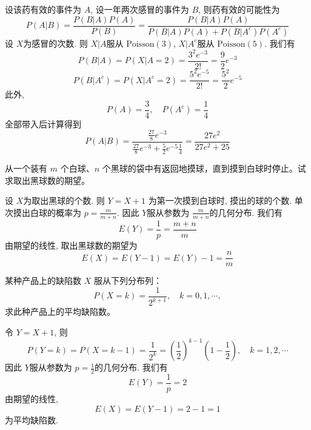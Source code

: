\documentclass[../main.tex]{subfiles}
\begin{document}
\begin{solution}
    设该药有效的事件为 \(  A  \), 设一年两次感冒的事件为 \(  B  \), 则药有效的可能性为 \[
  P\left( A|B \right) = \frac{P\left( B|A \right)P\left( A \right)   }{ P\left( B \right) }=  \frac{P\left( B|A \right)P\left( A \right)   }{P\left( B|A \right)P\left( A \right)+ P\left( B|A^{c} \right)P\left( A^{c} \right)     } 
    \] 设 \(  X  \)为感冒的次数. 则  \(  X|A  \)服从 \(  \mathrm{Poisson}\left( 3 \right)   \), \(  X|A^{c}  \)服从 \(  \mathrm{Poisson}\left( 5 \right)   \). 我们有 \[
    P\left( B|A \right)= P\left( X|A= 2 \right)= \frac{3^{2}e^{-3} }{2! }= \frac{9 }{2 }e^{-3}    
    \] \[
    P\left( B|A^{c} \right)= P\left( X|A^{c}= 2 \right)= \frac{5^{2}e^{-5} }{2! }= \frac{5^{2} }{2}e^{-5}    
    \]     此外,  \[
    P\left( A \right)= \frac{3 }{4 },\quad P\left( A^{c} \right)= \frac{1 }{4 }    
    \]全部带入后计算得到 \[
    P\left( A|B \right)= \frac{\frac{27 }{8 }e^{-3}  }{\frac{27 }{8 }e^{-3}+ \frac{5 }{2 }e^{-5}\frac{1 }{4 }    }  =\frac{27e^{2} }{27e^{2}+ 25 } 
    \]
\end{solution}

\begin{exercise}{}{}
从一个装有 $m$ 个白球、$n$ 个黑球的袋中有返回地摸球，直到摸到白球时停止。试求取出黑球数的期望。
\end{exercise}

\begin{solution}
        设 \(  X  \)为取出黑球的个数. 则 \(  Y= X+ 1  \)  为第一次摸到白球时, 摸出的球的个数. 单次摸出白球的概率为 \(  p= \frac{m }{m+ n }   \). 因此 \(  Y  \)服从参数为 \(  \frac{m }{m+ n }   \)的几何分布. 我们有 \[
    E\left( Y \right)= \frac{1 }{p }= \frac{m+ n }{m }   
    \]由期望的线性, 取出黑球数的期望为 \[
    E\left( X \right)= E\left( Y-1 \right)= E\left( Y \right)-1=  \frac{n }{m }    
    \]   
\end{solution}

\begin{exercise}{}{}
某种产品上的缺陷数 $X$ 服从下列分布列：
\[
P(X = k) = \frac{1}{2^{k+1}}, \quad k = 0, 1, \cdots,
\]
求此种产品上的平均缺陷数。
\end{exercise}
\begin{solution}
   令 \(  Y= X+ 1  \), 则 \[
   P\left( Y= k \right)= P\left( X = k-1\right)=\frac{1 }{2^{k} }=   \left( \frac{1 }{2 } \right)^{k-1} \left( 1-\frac{1 }{2 }  \right)    ,\quad  k= 1,2,\cdots 
   \]       因此 \(  Y  \)服从参数为 \( p=  \frac{1 }{2 }   \)的几何分布. 我们有 \[
   E\left( Y \right)= \frac{1 }{p } = 2
   \]  由期望的线性,  \[
   E\left( X \right)= E\left( Y-1 \right)= 2-1= 1  
   \]为平均缺陷数.
\end{solution}
\end{document}
